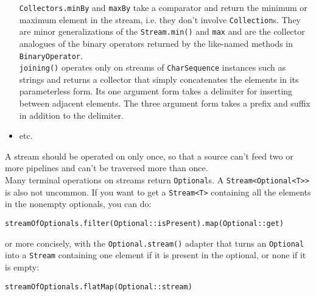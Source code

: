 \documentclass[8pt, table, xcdraw]{article}%
\begin{document}
\begin{itemize}
    \lstinline{Collectors.minBy} and \lstinline{maxBy} take a comparator and return the minimum or maximum element in the stream, i.e. they don't involve \lstinline{Collection}s. They are minor generalizations of the \lstinline{Stream.min()} and \lstinline{max} and are the collector analogues of the binary operators returned by the like-named methods in \lstinline{BinaryOperator}.\\
    \lstinline{joining()} operates only on streams of \lstinline{CharSequence} instances such as strings and returns a collector that simply concatenates the elements in its parameterless form. Its one argument form takes a delimiter for inserting between adjacent elements. The three argument form takes a prefix and suffix in addition to the delimiter.
    \item etc.
\end{itemize}

A stream should be operated on only once, so that a source can't feed two or more pipelines and can't be traversed more than once.\\
Many terminal operations on streams return \lstinline{Optional}s. A \lstinline{Stream<Optional<T>>} is also not uncommon. If you want to get a \lstinline{Stream<T>} containing all the elements in the nonempty optionals, you can do:

\begin{lstlisting}
streamOfOptionals.filter(Optional::isPresent).map(Optional::get)
\end{lstlisting}

or more concisely, with the \lstinline{Optional.stream()} adapter that turns an \lstinline{Optional} into a \lstinline{Stream} containing one element if it is present in the optional, or none if it is empty:

\begin{lstlisting}
streamOfOptionals.flatMap(Optional::stream)
\end{lstlisting}
\end{document}
